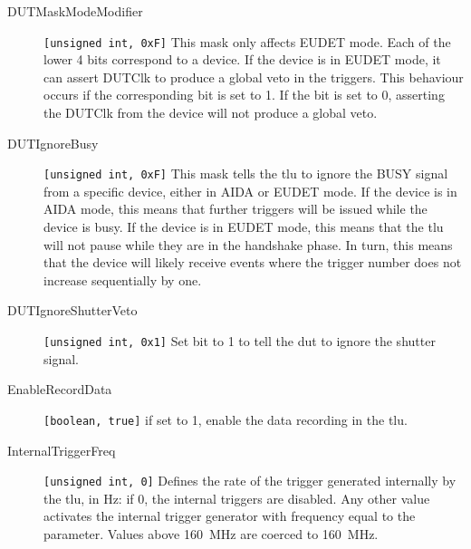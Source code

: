 \begin{description}
  \item[DUTMaskModeModifier] \verb|[unsigned int, 0xF]| This mask only affects EUDET mode. Each of the lower 4 bits correspond to a device. If the device is in EUDET mode, it can assert DUTClk to produce a global veto in the triggers. This behaviour occurs if the corresponding bit is set to 1. If the bit is set to 0, asserting the DUTClk from the device will not produce a global veto.
  \item[DUTIgnoreBusy] \verb|[unsigned int, 0xF]| This mask tells the \gls{tlu} to ignore the BUSY signal from a specific device, either in AIDA or EUDET mode. If the device is in AIDA mode, this means that further triggers will be issued while the device is busy. If the device is in EUDET mode, this means that the \gls{tlu} will not pause while they are in the handshake phase. In turn, this means that the device will likely receive events where the trigger number does not increase sequentially by one.
  \item[DUTIgnoreShutterVeto] \verb|[unsigned int, 0x1]| Set bit to 1 to tell the \gls{dut} to ignore the shutter signal.
  \item[EnableRecordData] \verb|[boolean, true]| if set to 1, enable the data recording in the \gls{tlu}.
  \item[InternalTriggerFreq] \verb|[unsigned int, 0]| Defines the rate of the trigger generated internally by the \gls{tlu}, in Hz: if 0, the internal triggers are disabled. Any other value activates the internal trigger generator with frequency equal to the parameter. Values above 160~MHz are coerced to 160~MHz.
\end{description} 